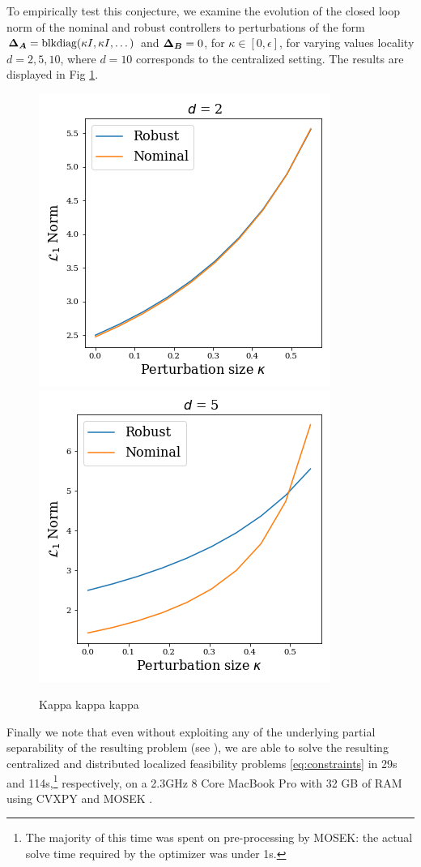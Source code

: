 To empirically test this conjecture, we examine the evolution of the closed loop norm of the nominal and robust controllers to perturbations of the form ${\boldsymbol{\Delta}}_{\boldsymbol{A}} = \mathrm{blkdiag}(\kappa I, \kappa I, \dots)$ and ${\boldsymbol{\Delta}}_{\boldsymbol{B}} = 0$, for $\kappa \in [0,\epsilon]$, for varying values locality $d=2,5,10$, where $d=10$ corresponds to the centralized setting.  The results are displayed in Fig \ref{fig:kappa}.

\begin{figure}
\includegraphics[width=.45\columnwidth]{d2.png}~\includegraphics[width=.45\columnwidth]{d5.png}
\caption{Kappa kappa kappa}
\label{fig:kappa}
\end{figure}

Finally we note that even without exploiting any of the underlying partial separability of the resulting problem (see \cite{wang2018separable}), we are able to solve the resulting centralized and distributed localized feasibility problems \eqref{eq:constraints} in 29s and 114s,\footnote{The majority of this time was spent on pre-processing by MOSEK: the actual solve time required by the optimizer was under 1s.} respectively, on a 2.3GHz 8 Core MacBook Pro with 32 GB of RAM using CVXPY \cite{diamond2016cvxpy} and MOSEK \cite{andersen2000mosek}.